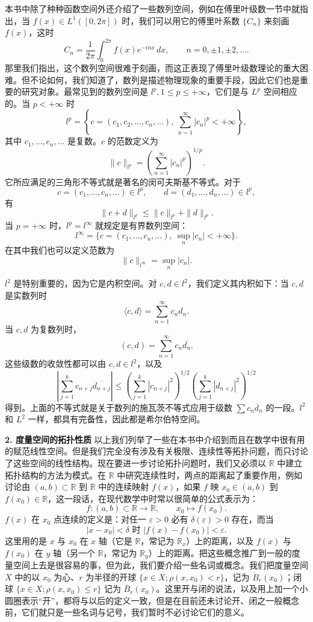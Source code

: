 本书中除了种种函数空间外还介绍了一些数列空间，例如在傅里叶级数一节中就指出，当 $f(x)\in L^1([0,2\pi])$ 时，我们可以用它的傅里叶系数 $\{C_n\}$ 来刻画 $f(x)$，这时
\[
 C_n=\frac1{2\pi}\int_0^{2\pi}f(x)e^{-inx}\,dx,\qquad n=0,\pm1,\pm2,\ldots.
\]
那里我们指出，这个数列空间很难于刻画，而这正表现了傅里叶级数理论的重大困难。但不论如何，我们知道了，数列是描述物理现象的重要手段，因此它们也是重要的研究对象。最常见到的数列空间是 $l^p,1\le p\le+\infty$，它们是与 $L^p$ 空间相应的。当 $p<+\infty$ 时
\[
 l^p=\left\{c=(c_1,c_2,\ldots,c_n,\ldots),\ \sum_{n=1}^\infty|c_n|^p<+\infty\right\},
\]
其中 $c_1,\ldots,c_n,\ldots$ 是复数。$c$ 的范数定义为
\[
 \|c\|_{l^p}=\left(\sum_{n=1}^\infty|c_n|^p\right)^{1/p}.
\]
它所应满足的三角形不等式就是著名的闵可夫斯基不等式。对于
\[
 c=(c_1,\ldots,c_n,\ldots)\in l^p,\qquad
 d=(d_1,\ldots,d_n,\ldots)\in l^p,
\]
有
\[
 \|c+d\|_{l^p}\le \|c\|_{l^p}+\|d\|_{l^p}.
\]
当 $p=+\infty$ 时，$l^p=l^\infty$ 就规定是有界数列空间：
\[
 l^\infty=\{c=(c_1,\ldots,c_n,\ldots),\ \sup_n|c_n|<+\infty\}.
\]
在其中我们也可以定义范数为
\[
 \|c\|_{l^\infty}=\sup_n|c_n|.
\]

$l^2$ 是特别重要的，因为它是内积空间。对 $c,d\in l^2$，我们定义其内积如下：当 $c,d$ 是实数列时
\[
 \langle c,d\rangle=\sum_{n=1}^\infty c_n d_n.
\]
当 $c,d$ 为复数列时，
\[
 (c,d)=\sum_{n=1}^\infty c_n\overline{d_n}.
\]
这些级数的收敛性都可以由 $c,d\in l^2$，以及
\[
 \left|\sum_{j=1}^k c_{n+j}\overline{d_{n+j}}\right|
 \le\left(\sum_{j=1}^k|c_{n+j}|^2\right)^{1/2}
 \left(\sum_{j=1}^k|d_{n+j}|^2\right)^{1/2}
\]
得到。上面的不等式就是关于数列的施瓦茨不等式应用于级数 $\sum c_n\overline d_n$ 的一段。$l^2$ 和 $L^2$ 一样，都具有完备性，因此都是希尔伯特空间。

\noindent\textbf{2. 度量空间的拓扑性质}\quad
以上我们列举了一些在本书中介绍到而且在数学中很有用的赋范线性空间。但是我们完全没有涉及有关极限、连续性等拓扑问题，而只讨论了这些空间的线性结构。现在要进一步讨论拓扑问题时，我们又必须以 $\mathbb R$ 中建立拓扑结构的方法为模式。在 $\mathbb R$ 中研究连续性时，两点的距离起了重要作用，例如讨论由 $(a,b)\subset\mathbb R$ 到 $\mathbb R$ 中的连续映射 $f(x)$，如果 $f$ 映 $x_0\in(a,b)$ 到 $f(x_0)\in\mathbb R$，这一段话，在现代数学中时常以很简单的公式表示为：
\[
 f:(a,b)\subset\mathbb R\to\mathbb R,\qquad x_0\mapsto f(x_0).
\]
$f(x)$ 在 $x_0$ 点连续的定义是：对任一 $\varepsilon>0$ 必有 $\delta(\varepsilon)>0$ 存在，而当
\[
 |x-x_0|<\delta\text{ 时 }|f(x)-f(x_0)|<\varepsilon.
\]
这里用的是 $x$ 与 $x_0$ 在 $x$ 轴（它是 $\mathbb R$，常记为 $\mathbb R_x$）上的距离，以及 $f(x)$ 与 $f(x_0)$ 在 $y$ 轴（另一个 $\mathbb R$，常记为 $\mathbb R_y$）上的距离。把这些概念推广到一般的度量空间上去是很容易的事，但为此，我们要介绍一些名词或概念。我们把度量空间 $X$ 中的以 $x_0$ 为心、$r$ 为半径的开球 $\{x\in X;\rho(x,x_0)<r\}$，记为 $\mathring B_r(x_0)$；闭球 $\{x\in X;\rho(x,x_0)\le r\}$ 记为 $\overline B_r(x_0)$。这里开与闭的说法，以及用上加一个小圆圈表示“开”，都将与以后的定义一致，但是在目前还未讨论开、闭之一般概念前，它们就只是一些名词与记号，我们暂时不必讨论它们的意义。

